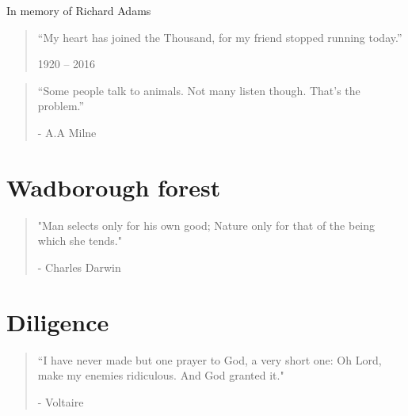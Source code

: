 \vspace*{4.3cm}
\begin{center}
	\begin{localsize}{10}
		In memory of Richard Adams\\
		\begin{quote}
			“My heart has joined the Thousand, for my friend stopped running today.”
			\begin{flushright}1920 -- 2016\end{flushright}
		\end{quote} 
	\end{localsize}
	\vspace{1cm}
	
\end{center}

\clearpage

\vspace*{4.3cm}
\begin{localsize}{10}
  \begin{quote}
    “Some people talk to animals. Not many listen though. That's the problem.”
    \begin{flushright}- A.A Milne \end{flushright}
  \end{quote} 
\end{localsize}
\vspace{1cm}


\chapter{Wadborough forest} %

\vspace{-1.3cm}
\begin{localsize}{10}
	\begin{quote}
		"Man selects only for his own good; Nature only for that of the being which she tends."
		\begin{flushright}- Charles Darwin\end{flushright}
	\end{quote} 
\end{localsize}


\chapter{Diligence} %

\vspace{-1.3cm}
\begin{localsize}{10}
	\begin{quote}
		“I have never made but one prayer to God, a very short one: Oh Lord, make my enemies ridiculous. And God granted it."
		\begin{flushright}- Voltaire \end{flushright}
	\end{quote}
\end{localsize}
\vspace{1cm}

